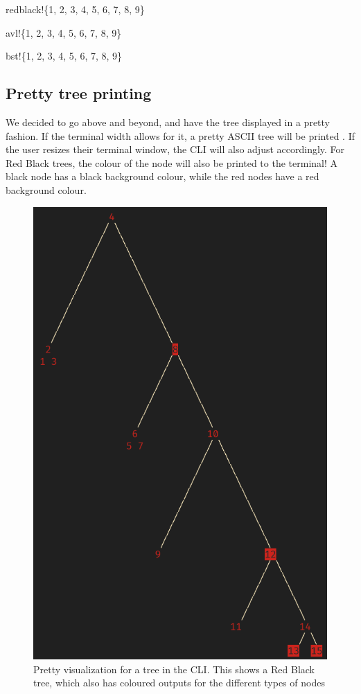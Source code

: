 \documentclass[letterpaper]{article}
\begin{document}
\begin{texttt}
  redblack!\{1, 2, 3, 4, 5, 6, 7, 8, 9\}
\end{texttt}

\begin{texttt}
  avl!\{1, 2, 3, 4, 5, 6, 7, 8, 9\}
\end{texttt}

\begin{texttt}
  bst!\{1, 2, 3, 4, 5, 6, 7, 8, 9\}
\end{texttt}

\subsection{Pretty tree printing}
We decided to go above and beyond, and have the tree displayed in a pretty
fashion. If the terminal width allows for it, a pretty ASCII tree will be
printed . If the user resizes their terminal window, the CLI will also adjust
accordingly.  For Red Black trees, the colour of the node will also be printed
to the terminal! A black node has a black background colour, while the red nodes
have a red background colour.
\begin{figure}[H]
      \centering
      \includegraphics[width=.8\textwidth]{rbtree.png}
      \caption{Pretty visualization for a tree in the CLI. This shows a Red
      Black tree, which also has coloured outputs for the different types of
      nodes}
\end{figure}
\end{document}
